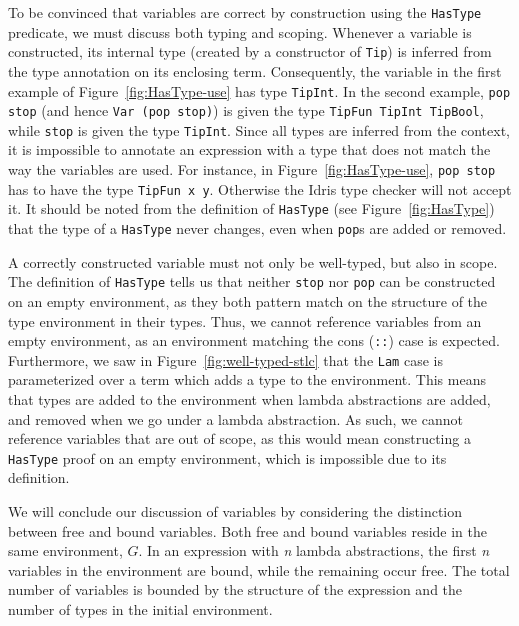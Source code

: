 To be convinced that variables are correct by construction using the \texttt{HasType} predicate, we must discuss both typing and scoping. Whenever a variable is constructed, its internal type (created by a constructor of \texttt{Tip}) is inferred from the type annotation on its enclosing term. Consequently, the variable in the first example of Figure~\ref{fig:HasType-use} has type \texttt{TipInt}. In the second example, \texttt{pop stop} (and hence \texttt{Var (pop stop)}) is given the type \texttt{TipFun TipInt TipBool}, while \texttt{stop} is given the type \texttt{TipInt}. Since all types are inferred from the context, it is impossible to annotate an expression with a type that does not match the way the variables are used. For instance, in Figure~\ref{fig:HasType-use}, \texttt{pop stop} has to have the type \texttt{TipFun x y}. Otherwise the Idris type checker will not accept it. It should be noted from the definition of \texttt{HasType} (see Figure~\ref{fig:HasType}) that the type of a \texttt{HasType} never changes, even when \texttt{pop}s are added or removed. 

A correctly constructed variable must not only be well-typed, but also in scope. The definition of \texttt{HasType} tells us that neither \texttt{stop} nor \texttt{pop} can be constructed on an empty environment, as they both pattern match on the structure of the type environment in their types. Thus, we cannot reference variables from an empty environment, as an environment matching the cons (\texttt{::}) case is expected. Furthermore, we saw in Figure~\ref{fig:well-typed-stlc} that the \texttt{Lam} case is parameterized over a term which adds a type to the environment. This means that types are added to the environment when lambda abstractions are added, and removed when we go under a lambda abstraction. As such, we cannot reference variables that are out of scope, as this would mean constructing a \texttt{HasType} proof on an empty environment, which is impossible due to its definition. 

We will conclude our discussion of variables by considering the distinction between free and bound variables. Both free and bound variables reside in the same environment, $G$. In an expression with \textit{n} lambda abstractions, the first \textit{n} variables in the environment are bound, while the remaining occur free. The total number of variables is bounded by the structure of the expression and the number of types in the initial environment.


